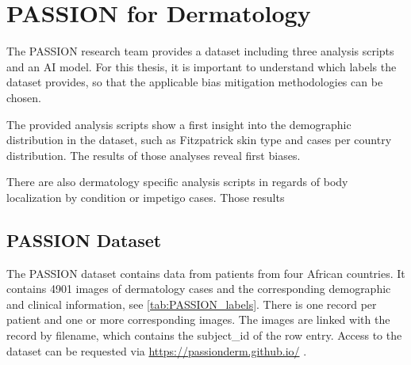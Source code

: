 \documentclass[a4paper,10.5pt,
			   bindingoffset=0.2in,left=3.35cm,right=2.12cm,top=3.75cm,bottom=2.88cm,%
				footskip=.25in
				listof=numbered,toc=chapterentrywithdots]{scrreport}
\begin{document}
		\section{PASSION for Dermatology}
			The PASSION research team provides a dataset including three analysis scripts and an AI model. For this thesis, it is important to understand which labels the dataset provides, so that the applicable bias mitigation methodologies can be chosen.
			
			The provided analysis scripts show a first insight into the demographic distribution in the dataset, such as Fitzpatrick skin type and cases per country distribution. The results of those analyses reveal first biases.
			
			There are also dermatology specific analysis scripts in regards of body localization by condition or impetigo cases. Those results 
			
			\subsection{PASSION Dataset}
			The PASSION dataset contains data from patients from four African countries. It contains 4901 images of dermatology cases and the corresponding demographic and clinical information, see \autoref{tab:PASSION_labels}. There is one record per patient and one or more corresponding images. The images are linked with the record by filename, which contains the subject\_id of the row entry. Access to the dataset can be requested via \href{https://passionderm.github.io/}{https://passionderm.github.io/} \autocite{Gottfrois2024}.
			
\end{document}
